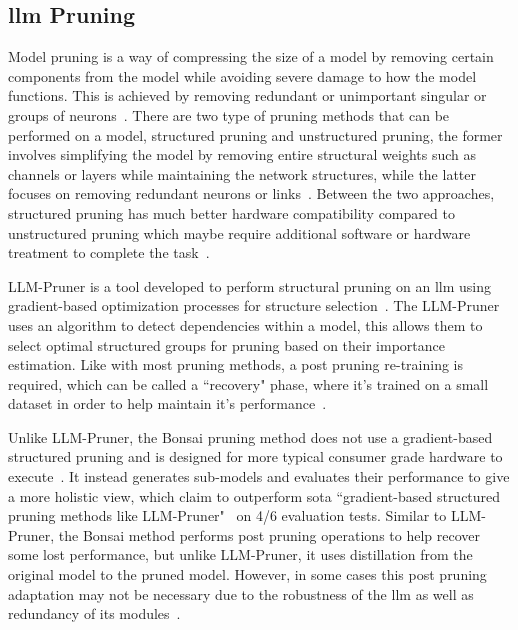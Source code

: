 \documentclass{ifacconf}
\begin{document}
	\subsection{\gls{llm} Pruning}
	Model pruning is a way of compressing the size of a model by removing certain components from the model while avoiding severe damage to how the model functions. This is achieved by removing redundant or unimportant singular or groups of neurons~\cite{huang2024largelanguagemodelpruning}. There are two type of pruning methods that can be performed on a model, structured pruning and unstructured pruning, the former involves simplifying the model by removing entire structural weights such as channels or layers while maintaining the network structures, while the latter focuses on removing redundant neurons or links~\cite{huang2024largelanguagemodelpruning}. Between the two approaches, structured pruning has much better hardware compatibility compared to unstructured pruning which maybe require additional software or hardware treatment to complete the task~\cite{huang2024largelanguagemodelpruning}.
	
	LLM-Pruner is a tool developed to perform structural pruning on an \gls{llm} using gradient-based optimization processes for structure selection~\cite{ma2023llmprunerstructuralpruninglarge}. The LLM-Pruner uses an algorithm to detect dependencies within a model, this allows them to select optimal structured groups for pruning based on their importance estimation. Like with most pruning methods, a post pruning re-training is required, which can be called a ``recovery" phase, where it's trained on a small dataset in order to help maintain it's performance~\cite{ma2023llmprunerstructuralpruninglarge}.
	
	Unlike LLM-Pruner, the Bonsai pruning method does not use a gradient-based structured pruning and is designed for more typical consumer grade hardware to execute~\cite{dery2024everybodyprunenowstructured}. It instead generates sub-models and evaluates their performance to give a more holistic view, which claim to outperform \gls{sota} ``gradient-based structured pruning methods like LLM-Pruner"~\cite[p.~2]{dery2024everybodyprunenowstructured} on 4/6 evaluation tests. Similar to LLM-Pruner, the Bonsai method performs post pruning operations to help recover some lost performance, but unlike LLM-Pruner, it uses distillation from the original model to the pruned model. However, in some cases this post pruning adaptation may not be necessary due to the robustness of the \gls{llm} as well as redundancy of its modules~\cite{dery2024everybodyprunenowstructured}.
	
\end{document}
